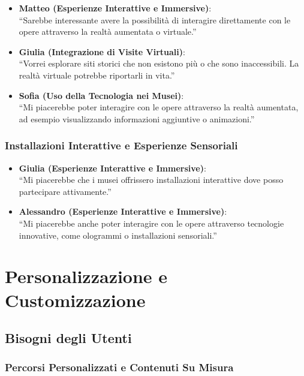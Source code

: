 \documentclass{article}
\begin{document}
\begin{itemize}
    \item \textbf{Matteo (Esperienze Interattive e Immersive)}:\\
    ``Sarebbe interessante avere la possibilità di interagire direttamente con le opere attraverso la realtà aumentata o virtuale.''
    \item \textbf{Giulia (Integrazione di Visite Virtuali)}:\\
    ``Vorrei esplorare siti storici che non esistono più o che sono inaccessibili. La realtà virtuale potrebbe riportarli in vita.''
    \item \textbf{Sofia (Uso della Tecnologia nei Musei)}:\\
    ``Mi piacerebbe poter interagire con le opere attraverso la realtà aumentata, ad esempio visualizzando informazioni aggiuntive o animazioni.''
\end{itemize}

\subsubsection{Installazioni Interattive e Esperienze Sensoriali}

\begin{itemize}
    \item \textbf{Giulia (Esperienze Interattive e Immersive)}:\\
    ``Mi piacerebbe che i musei offrissero installazioni interattive dove posso partecipare attivamente.''
    \item \textbf{Alessandro (Esperienze Interattive e Immersive)}:\\
    ``Mi piacerebbe anche poter interagire con le opere attraverso tecnologie innovative, come ologrammi o installazioni sensoriali.''
\end{itemize}

\section{Personalizzazione e Customizzazione}

\subsection{Bisogni degli Utenti}

\subsubsection{Percorsi Personalizzati e Contenuti Su Misura}
\end{document}
